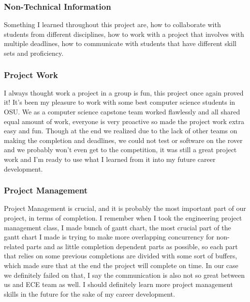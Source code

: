 \documentclass[10pt,letterpaper,onecolumn,draftclsnofoot,journal]{IEEEtran}
\begin{document}
\subsubsection{\textbf{Non-Technical Information}}
Something I learned throughout this project are, how to collaborate with students from different disciplines, how to work with a project that involves with multiple deadlines, how to communicate with students that have different skill sets and proficiency.
\vspace{.3cm}

\subsubsection{\textbf{Project Work}}
I always thought work a project in a group is fun, this project once again proved it! It's been my pleasure to work with some best computer science students in OSU. We as a computer science capstone team worked flawlessly and all shared equal amount of work, everyone is very proactive so made the project work extra easy and fun. Though at the end we realized due to the lack of other teams on making the completion and deadlines, we could not test or software on the rover and we probably won't even get to the competition, it was still a great project work and I'm ready to use what I learned from it into my future career development.
\vspace{.3cm}

\subsubsection{\textbf{Project Management}}
Project Management is crucial, and it is probably the most important part of our project, in terms of completion. I remember when I took the engineering project management class, I made bunch of gantt chart, the most crucial part of the gantt chart I made is trying to make more overlapping concurrency for non-related parts and as little completion dependent parts as possible, so each part that relies on some previous completions are divided with some sort of buffers, which made sure that at the end the project will complete on time. In our case we definitely failed on that, I say the communication is also not so great between us and ECE team as well. I should definitely learn more project management skills in the future for the sake of my career development.
\vspace{.3cm}
\end{document}
